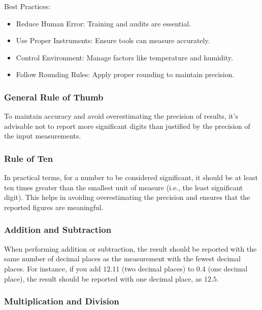 \documentclass[
  a4paper,
]{scrbook}
\providecommand{\tightlist}{%
  \setlength{\itemsep}{0pt}\setlength{\parskip}{0pt}}\usepackage{longtable,booktabs,array}
\begin{document}
Best Practices:

\begin{itemize}
\tightlist
\item
  Reduce Human Error: Training and audits are essential.
\item
  Use Proper Instruments: Ensure tools can measure accurately.
\item
  Control Environment: Manage factors like temperature and humidity.
\item
  Follow Rounding Rules: Apply proper rounding to maintain precision.
\end{itemize}

\subsubsection{General Rule of Thumb}\label{general-rule-of-thumb}

To maintain accuracy and avoid overestimating the precision of results,
it's advisable not to report more significant digits than justified by
the precision of the input measurements.

\subsubsection{Rule of Ten}\label{rule-of-ten}

In practical terms, for a number to be considered significant, it should
be at least ten times greater than the smallest unit of measure (i.e.,
the least significant digit). This helps in avoiding overestimating the
precision and ensures that the reported figures are meaningful.

\subsubsection{Addition and Subtraction}\label{addition-and-subtraction}

When performing addition or subtraction, the result should be reported
with the same number of decimal places as the measurement with the
fewest decimal places. For instance, if you add \(12.11\) (two decimal
places) to \(0.4\) (one decimal place), the result should be reported
with one decimal place, as \(12.5\).

\subsubsection{Multiplication and
Division}\label{multiplication-and-division}
\end{document}
